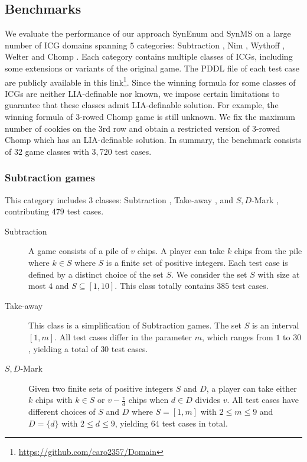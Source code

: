 \documentclass[review]{elsarticle}
\newcommand{\set}[1]{\{ #1 \}}
\begin{document}
\subsection{Benchmarks}
We evaluate the performance of our approach SynEnum and SynMS on a large number of ICG domains spanning $5$ categories: Subtraction \cite{Yag2001}, Nim \cite{Bou1901}, Wythoff \cite{Wyt1907}, Welter \cite{Wel1952} and Chomp \cite{Sch1952}.
Each category contains multiple classes of ICGs, including some extensions or variants of the original game.
The PDDL file of each test case are publicly available in this link\footnote{\url{https://github.com/caro2357/Domain}}.
Since the winning formula for some classes of ICGs are neither LIA-definable nor known, we impose certain limitations to guarantee that these classes admit LIA-definable solution.
For example, the winning formula of 3-rowed Chomp game is still unknown.
We fix the maximum number of cookies on the 3rd row and obtain a restricted version of 3-rowed Chomp which has an LIA-definable solution.
In summary, the benchmark consists of $32$ game classes with $3,720$ test cases.

\subsubsection{Subtraction games}
This category includes $3$ classes: Subtraction \cite{Yag2001}, Take-away \cite{Gol1966}, and $S,D$-Mark \cite{Sop2016}, contributing $479$ test cases. %

\begin{description}
	\item[Subtraction] 
	A game consists of a pile of $v$ chips.
	A player can take $k$ chips from the pile where $k \in S$ where $S$ is a finite set of positive integers.
	Each test case is defined by a distinct choice of the set $S$.
	We consider the set $S$ with size at most $4$ and $S \subseteq [1, 10]$.
	This class totally contains $385$ test cases.
	
	\item[Take-away] This class is a simplification of Subtraction games.
	The set $S$ is an interval $[1, m]$.
	All test cases differ in the parameter $m$, which ranges from $1$ to $30$, yielding a total of $30$ test cases.	

	
	\item[$S,D$-Mark] Given two finite sets of positive integers $S$ and $D$, a player can take either $k$ chips with $k \in S$ or $v - \frac{v}{d}$ chips when $d \in D$ divides $v$.
	All test cases have different choices of $S$ and $D$ where $S = [1, m]$ with $2 \leq m \leq 9$ and $D = \set{d}$ with $2 \leq d \leq 9$, yielding $64$ test cases in total.
\end{description}
\end{document}
